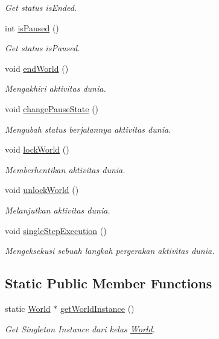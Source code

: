 \begin{DoxyCompactItemize}
\begin{DoxyCompactList}\small\item\em Get status is\+Ended. \end{DoxyCompactList}\item 
int \hyperlink{class_world_ad06b05aabbcbe0c93106793bdb5fcc2c}{is\+Paused} ()
\begin{DoxyCompactList}\small\item\em Get status is\+Paused. \end{DoxyCompactList}\item 
void \hyperlink{class_world_a30a87c6071aef420fc2e9df913a7452d}{end\+World} ()
\begin{DoxyCompactList}\small\item\em Mengakhiri aktivitas dunia. \end{DoxyCompactList}\item 
void \hyperlink{class_world_a1df17b17270667dc2ff9ff52f6ade6c0}{change\+Pause\+State} ()
\begin{DoxyCompactList}\small\item\em Mengubah status berjalannya aktivitas dunia. \end{DoxyCompactList}\item 
void \hyperlink{class_world_a63197059e4c4f18349aec3c1daa66a01}{lock\+World} ()
\begin{DoxyCompactList}\small\item\em Memberhentikan aktivitas dunia. \end{DoxyCompactList}\item 
void \hyperlink{class_world_a08481fdff65e290c44386676ce993dce}{unlock\+World} ()
\begin{DoxyCompactList}\small\item\em Melanjutkan aktivitas dunia. \end{DoxyCompactList}\item 
void \hyperlink{class_world_ad1de870945ddd37c62bb6bd32134d725}{single\+Step\+Execution} ()
\begin{DoxyCompactList}\small\item\em Mengeksekusi sebuah langkah pergerakan aktivitas dunia. \end{DoxyCompactList}\end{DoxyCompactItemize}
\subsection*{Static Public Member Functions}
\begin{DoxyCompactItemize}
\item 
static \hyperlink{class_world}{World} $\ast$ \hyperlink{class_world_a7a8d0b3f76f0ecde36ffe28f9b08f30f}{get\+World\+Instance} ()
\begin{DoxyCompactList}\small\item\em Get Singleton Instance dari kelas \hyperlink{class_world}{World}. \end{DoxyCompactList}\end{DoxyCompactItemize}


